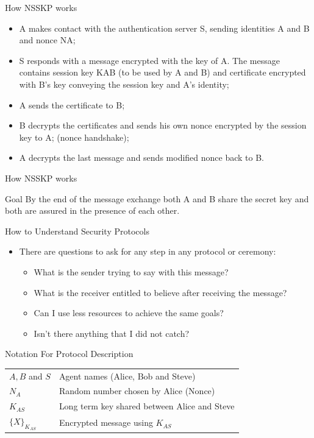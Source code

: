 \documentclass[12pt,table,xcolor={dvipsnames}]{beamer}
\begin{document}
\begin{frame}{How NSSKP works}
\begin{itemize}
\item A makes contact with the authentication server S, sending identities A and B and nonce NA;\pause
\item S responds with a message encrypted with the key of A. The message contains session key KAB (to be used by A and B) and certificate encrypted with B’s key conveying the session key and A’s identity;\pause
\item A sends the certificate to B;\pause
\item B decrypts the certificates and sends his own nonce encrypted by the session key to A; (nonce handshake);\pause
\item A decrypts the last message and sends modified nonce back to B.
\end{itemize}
\end{frame}

\begin{frame}{How NSSKP works}
\begin{block}{Goal}
By the end of the message exchange both A and B share the secret key and both are assured in the presence of each other. 
\end{block}
\end{frame}

\begin{frame}{How to Understand Security Protocols}
\begin{itemize}
\item There are questions to ask for any step in any protocol or ceremony:\pause
\begin{itemize}
\item What is the sender trying to say with this message?\pause
\item What is the receiver entitled to believe after receiving the message?\pause
\item Can I use less resources to achieve the same goals?\pause
\item Isn't there anything that I did not catch?
\end{itemize}
\end{itemize}
\end{frame}

\begin{frame}{Notation For Protocol Description}
\begin{table}[htdp]
\begin{center}
\begin{tabular}{ l l }
$A, B$ and $S$ & Agent names (Alice, Bob and Steve) \\\pause
$N_A$ & Random number chosen by Alice (Nonce)\\\pause
$K_{AS}$ & Long term key shared between Alice and Steve\\\pause
$\{X\}_{K_{AS}}$ & Encrypted message using $K_{AS}$\\
\end{tabular}
\end{center}
\label{default}
\end{table}%
\end{frame}
\end{document}
